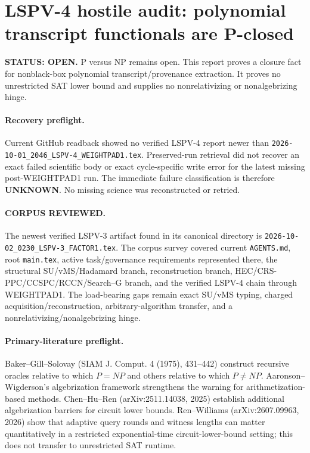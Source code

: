 \documentclass[11pt]{article}
\begin{document}
\section*{LSPV-4 hostile audit: polynomial transcript functionals are P-closed}

\textbf{STATUS: OPEN.} P versus NP remains open. This report proves a closure fact for nonblack-box polynomial transcript/provenance extraction. It proves no unrestricted SAT lower bound and supplies no nonrelativizing or nonalgebrizing hinge.

\paragraph{Recovery preflight.}
Current GitHub readback showed no verified LSPV-4 report newer than \texttt{2026-10-01\_2046\_LSPV-4\_WEIGHTPAD1.tex}. Preserved-run retrieval did not recover an exact failed scientific body or exact cycle-specific write error for the latest missing post-WEIGHTPAD1 run. The immediate failure classification is therefore \textbf{UNKNOWN}. No missing science was reconstructed or retried.

\paragraph{CORPUS REVIEWED.}
The newest verified LSPV-3 artifact found in its canonical directory is \texttt{2026-10-02\_0230\_LSPV-3\_FACTOR1.tex}. The corpus survey covered current \texttt{AGENTS.md}, root \texttt{main.tex}, active task/governance requirements represented there, the structural SU/vMS/Hadamard branch, reconstruction branch, HEC/CRS-PPC/CCSPC/RCCN/Search--G branch, and the verified LSPV-4 chain through WEIGHTPAD1. The load-bearing gaps remain exact SU/vMS typing, charged acquisition/reconstruction, arbitrary-algorithm transfer, and a nonrelativizing/nonalgebrizing hinge.

\paragraph{Primary-literature preflight.}
Baker--Gill--Solovay (SIAM J. Comput. 4 (1975), 431--442) construct recursive oracles relative to which $P=NP$ and others relative to which $P\ne NP$. Aaronson--Wigderson's algebrization framework strengthens the warning for arithmetization-based methods. Chen--Hu--Ren (arXiv:2511.14038, 2025) establish additional algebrization barriers for circuit lower bounds. Ren--Williams (arXiv:2607.09963, 2026) show that adaptive query rounds and witness lengths can matter quantitatively in a restricted exponential-time circuit-lower-bound setting; this does not transfer to unrestricted SAT runtime.
\end{document}
